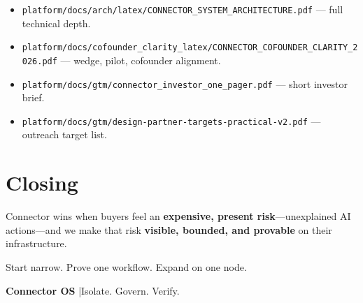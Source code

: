 \begin{itemize}
  \item \texttt{platform/docs/arch/latex/CONNECTOR\_SYSTEM\_ARCHITECTURE.pdf} --- full technical depth.
  \item \texttt{platform/docs/cofounder\_clarity\_latex/CONNECTOR\_COFOUNDER\_CLARITY\_2026.pdf} --- wedge, pilot, cofounder alignment.
  \item \texttt{platform/docs/gtm/connector\_investor\_one\_pager.pdf} --- short investor brief.
  \item \texttt{platform/docs/gtm/design-partner-targets-practical-v2.pdf} --- outreach target list.
\end{itemize}

\chapter*{Closing}

Connector wins when buyers feel an \textbf{expensive, present risk}---unexplained AI actions---and we make that risk \textbf{visible, bounded, and provable} on their infrastructure.

Start narrow. Prove one workflow. Expand on one node.

\vfill
\begin{center}
\textbf{Connector OS} \quad|\quad Isolate. Govern. Verify.
\end{center}
